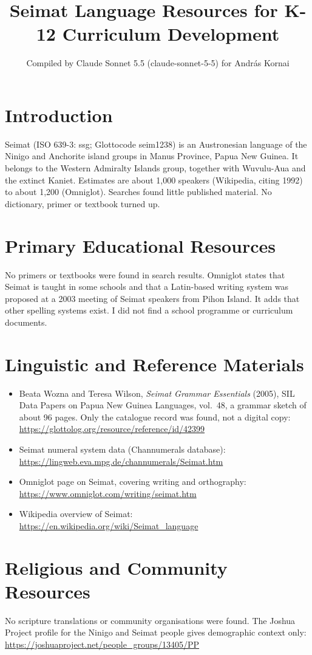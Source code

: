 \documentclass[12pt]{article}
\title{Seimat Language Resources for K-12 Curriculum Development}
\author{Compiled by Claude Sonnet 5.5 (claude-sonnet-5-5) for Andr\'as Kornai}
\date{}
\begin{document}
\maketitle

\section{Introduction}
Seimat (ISO 639-3: ssg; Glottocode seim1238) is an Austronesian language of the Ninigo and Anchorite island groups in Manus Province, Papua New Guinea. It belongs to the Western Admiralty Islands group, together with Wuvulu-Aua and the extinct Kaniet. Estimates are about 1,000 speakers (Wikipedia, citing 1992) to about 1,200 (Omniglot). Searches found little published material. No dictionary, primer or textbook turned up.

\section{Primary Educational Resources}
No primers or textbooks were found in search results. Omniglot states that Seimat is taught in some schools and that a Latin-based writing system was proposed at a 2003 meeting of Seimat speakers from Pihon Island. It adds that other spelling systems exist. I did not find a school programme or curriculum documents.

\section{Linguistic and Reference Materials}
\begin{itemize}
\item Beata Wozna and Teresa Wilson, \emph{Seimat Grammar Essentials} (2005), SIL Data Papers on Papua New Guinea Languages, vol.\ 48, a grammar sketch of about 96 pages. Only the catalogue record was found, not a digital copy: \url{https://glottolog.org/resource/reference/id/42399}
\item Seimat numeral system data (Channumerals database): \url{https://lingweb.eva.mpg.de/channumerals/Seimat.htm}
\item Omniglot page on Seimat, covering writing and orthography: \url{https://www.omniglot.com/writing/seimat.htm}
\item Wikipedia overview of Seimat: \url{https://en.wikipedia.org/wiki/Seimat_language}
\end{itemize}

\section{Religious and Community Resources}
No scripture translations or community organisations were found. The Joshua Project profile for the Ninigo and Seimat people gives demographic context only: \url{https://joshuaproject.net/people_groups/13405/PP}
\end{document}

